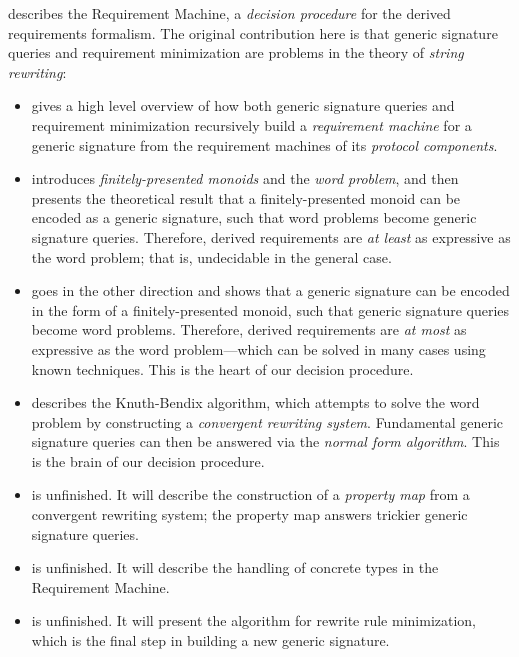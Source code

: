 \documentclass[../generics]{subfiles}
\begin{document}
 describes the Requirement Machine, a \emph{decision procedure} for the derived requirements formalism. The original contribution here is that generic signature queries and requirement minimization are problems in the theory of \emph{string rewriting}:
\begin{itemize}
\item {} gives a high level overview of how both generic signature queries and requirement minimization recursively build a \emph{requirement machine} for a generic signature from the requirement machines of its \emph{protocol components}.

\item {} introduces \emph{finitely-presented monoids} and the \emph{word problem}, and then presents the theoretical result that a finitely-presented monoid can be encoded as a generic signature, such that word problems become generic signature queries. Therefore, derived requirements are \emph{at least} as expressive as the word problem; that is, undecidable in the general case.

\item {} goes in the other direction and shows that a generic signature can be encoded in the form of a finitely-presented monoid, such that generic signature queries become word problems. Therefore, derived requirements are \emph{at most} as expressive as the word problem---which can be solved in many cases using known techniques. This is the heart of our decision procedure.

\item {} describes the Knuth-Bendix algorithm, which attempts to solve the word problem by constructing a \emph{convergent rewriting system}. Fundamental generic signature queries can then be answered via the \emph{normal form algorithm}. This is the brain of our decision procedure.

\item {} is unfinished. It will describe the construction of a \emph{property map} from a convergent rewriting system; the property map answers trickier generic signature queries.

\item {} is unfinished. It will describe the handling of concrete types in the Requirement Machine.

\item {} is unfinished. It will present the algorithm for rewrite rule minimization, which is the final step in building a new generic signature.
\end{itemize}
\end{document}
